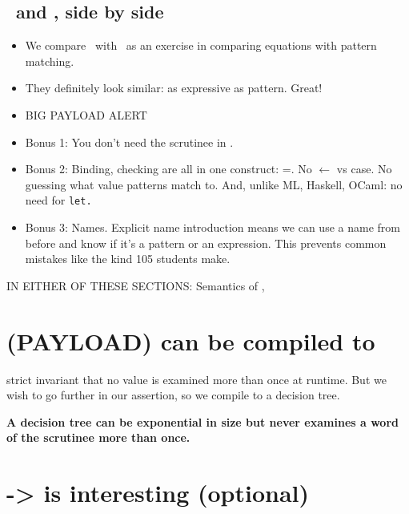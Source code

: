 \documentclass[manuscript,screen,review, 12pt]{acmart}
\begin{document}
    \subsection{\VMinus\ and \PPlus, side by side}

    \begin{itemize}
        \item We compare \VMinus\ with \PPlus\ as an exercise in comparing
        equations with pattern matching. 
        \item They definitely look similar: as expressive as pattern. Great! 
        \item{BIG PAYLOAD ALERT}
        \item Bonus 1: You don't need the scrutinee in \VMinus. 
        \item Bonus 2: Binding, checking are all in one construct: =. No
                $\leftarrow$ vs case. No guessing what value patterns match to. 
                And, unlike ML, Haskell, OCaml: no need for \tt{let}.
        \item Bonus 3: Names. Explicit name introduction means we can use a name
        from before and know if it's a pattern or an expression. This prevents
        common mistakes like the kind 105 students make. 
    \end{itemize}
    

    

    

    

IN EITHER OF THESE SECTIONS: Semantics of \PPlus, \VMinus

\section{(PAYLOAD) {\VMinus} can be compiled to }

    
    strict invariant that no value is examined more than once at runtime. But we wish to go further in our assertion, 
    so we compile \VMinus to a decision tree. 
    
    
    
    
    
    
    

    \bf{A decision tree can be exponential in size but never examines a word of
    the scrutinee more than once. }

    
    
    


\section{\PPlus -> \VMinus is interesting (optional)}
\end{document}
